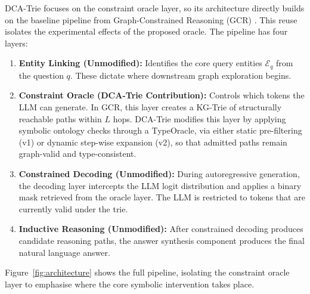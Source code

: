 DCA-Trie focuses on the constraint oracle layer, so its architecture directly builds on the baseline pipeline from Graph-Constrained Reasoning (GCR) \citep{luo2025-graph-constrained-reasoning}. This reuse isolates the experimental effects of the proposed oracle. The pipeline has four layers:

\begin{enumerate}
  \item \textbf{Entity Linking (Unmodified):} Identifies the core query entities $\mathcal{E}_q$ from the question $q$. These dictate where downstream graph exploration begins.

  \item \textbf{Constraint Oracle (DCA-Trie Contribution):} Controls which tokens the LLM can generate. In GCR, this layer creates a KG-Trie of structurally reachable paths within $L$ hops. DCA-Trie modifies this layer by applying symbolic ontology checks through a TypeOracle, via either static pre-filtering (v1) or dynamic step-wise expansion (v2), so that admitted paths remain graph-valid and type-consistent.

  \item \textbf{Constrained Decoding (Unmodified):} During autoregressive generation, the decoding layer intercepts the LLM logit distribution and applies a binary mask retrieved from the oracle layer. The LLM is restricted to tokens that are currently valid under the trie.

  \item \textbf{Inductive Reasoning (Unmodified):} After constrained decoding produces candidate reasoning paths, the answer synthesis component produces the final natural language answer.
\end{enumerate}

Figure~\ref{fig:architecture} shows the full pipeline, isolating the constraint oracle layer to emphasise where the core symbolic intervention takes place.



